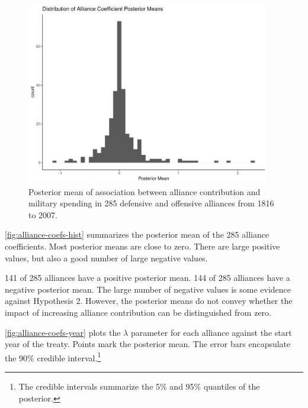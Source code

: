\documentclass[12pt]{article}
\begin{document}
\begin{figure}[htbp]
	\centering
		\includegraphics[width=0.95\textwidth]{alliance-coefs-hist.pdf}
	\caption{Posterior mean of association between alliance contribution and military spending in 285 defensive and offensive alliances from 1816 to 2007.}
	\label{fig:alliance-coefs-hist}
\end{figure}


\autoref{fig:alliance-coefs-hist} summarizes the posterior mean of the 285 alliance coefficients. 
Most posterior means are close to zero. 
There are large positive values, but also a good number of large negative values.


141 of 285 alliances have a positive posterior mean. 
144 of 285 alliances have a negative posterior mean. 
The large number of negative values is some evidence against Hypothesis 2. 
However, the posterior means do not convey whether the impact of increasing alliance contribution can be distinguished from zero. 


\autoref{fig:alliance-coefs-year} plots the $\lambda$ parameter for each alliance against the start year of the treaty.
Points mark the posterior mean. 
The error bars encapsulate the 90\% credible interval.\footnote{The credible intervals summarize the 5\% and 95\% quantiles of the posterior.}  
\end{document}

